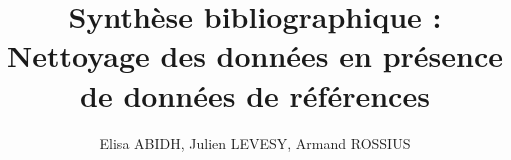 \documentclass[a4paper]{article}
\begin{document}
\title{Synthèse bibliographique : Nettoyage des données en présence de données de références}

\author{Elisa ABIDH, Julien LEVESY, Armand ROSSIUS}

\maketitle


\newpage
\tableofcontents
\newpage


\end{document}
